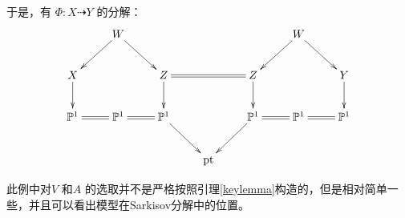 于是，有 $\Phi: X\dashrightarrow  Y$ 的分解：
\[ \xymatrix{
                                   & W\ar[ld]\ar[rd]          &                       &           &                                 & W\ar[ld]\ar[rd] \\
    X\ar[d]                        &                          & Z\ar[d]\ar@{=}[rr]    &           & Z\ar[d]                         &                           & Y\ar[d]\\
    \mathbb{P}^{1}\ar@{=}[r]       & \mathbb{P}^{1}\ar@{=}[r] & \mathbb{P}^{1}\ar[dr] &           & \mathbb{P}^{1}\ar[dl]\ar@{=}[r] & \mathbb{P}^{1}\ar@{=}[r] & \mathbb{P}^{1} \\
                                   &                          &                       & \text{pt} &                                 &                           & }\]
\begin{remark}
此例中对$V$ 和$A$ 的选取并不是严格按照引理\ref{keylemma}构造的，但是相对简单一些，并且可以看出模型在Sarkisov分解中的位置。
\end{remark}


